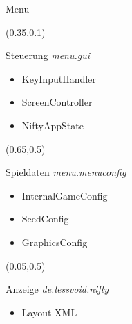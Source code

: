\documentclass[10pt]{beamer}
\begin{document}
\begin{frame}[fragile]{Menu}
    \setlength{\TPHorizModule}{\textwidth}
    \setlength{\TPVertModule}{\textwidth}
   
    \begin{textblock}{0.5}(0.35,0.1)
            \begin{block}{Steuerung}
                \textit{menu.gui}
                \begin{itemize}
                    \item KeyInputHandler
                    \item ScreenController
                    \item NiftyAppState
                \end{itemize}
            \end{block}
    \end{textblock}

    \begin{textblock}{0.5}(0.65,0.5)
            \begin{block}{Spieldaten}
                \textit{menu.menuconfig}
                \begin{itemize}
                    \item InternalGameConfig
                    \item SeedConfig
                    \item GraphicsConfig
                \end{itemize}
            \end{block}
    \end{textblock}

    \begin{textblock}{0.5}(0.05,0.5)
            \begin{block}{Anzeige}
                \textit{de.lessvoid.nifty}
                \begin{itemize}
                    \item Layout XML
                \end{itemize}
            \end{block}
    \end{textblock}
\end{frame}
\end{document}
